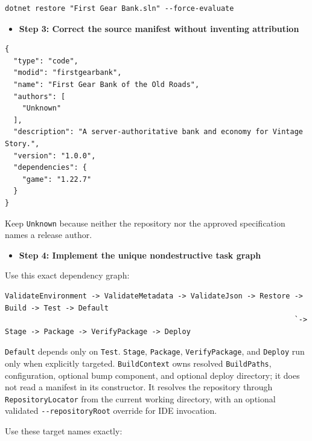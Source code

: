 \documentclass[
  10pt,
  letterpaper,
]{article}
\newcommand{\passthrough}[1]{#1}
\providecommand{\tightlist}{%
  \setlength{\itemsep}{0pt}\setlength{\parskip}{0pt}}
\begin{document}
\begin{lstlisting}
dotnet restore "First Gear Bank.sln" --force-evaluate
\end{lstlisting}

\begin{itemize}
\tightlist
\item[$\square$]
  \textbf{Step 3: Correct the source manifest without inventing
  attribution}
\end{itemize}

\begin{lstlisting}
{
  "type": "code",
  "modid": "firstgearbank",
  "name": "First Gear Bank of the Old Roads",
  "authors": [
    "Unknown"
  ],
  "description": "A server-authoritative bank and economy for Vintage Story.",
  "version": "1.0.0",
  "dependencies": {
    "game": "1.22.7"
  }
}
\end{lstlisting}

Keep \passthrough{\lstinline!Unknown!} because neither the repository
nor the approved specification names a release author.

\begin{itemize}
\tightlist
\item[$\square$]
  \textbf{Step 4: Implement the unique nondestructive task graph}
\end{itemize}

Use this exact dependency graph:

\begin{lstlisting}
ValidateEnvironment -> ValidateMetadata -> ValidateJson -> Restore -> Build -> Test -> Default
                                                                   `-> Stage -> Package -> VerifyPackage -> Deploy
\end{lstlisting}

\passthrough{\lstinline!Default!} depends only on
\passthrough{\lstinline!Test!}. \passthrough{\lstinline!Stage!},
\passthrough{\lstinline!Package!},
\passthrough{\lstinline!VerifyPackage!}, and
\passthrough{\lstinline!Deploy!} run only when explicitly targeted.
\passthrough{\lstinline!BuildContext!} owns resolved
\passthrough{\lstinline!BuildPaths!}, configuration, optional bump
component, and optional deploy directory; it does not read a manifest in
its constructor. It resolves the repository through
\passthrough{\lstinline!RepositoryLocator!} from the current working
directory, with an optional validated
\passthrough{\lstinline!--repositoryRoot!} override for IDE invocation.

Use these target names exactly:
\end{document}
